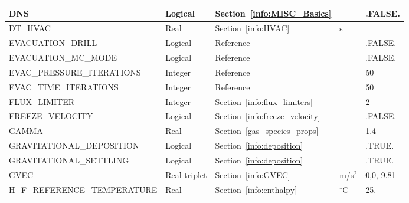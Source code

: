 \documentclass[11pt]{book}
\begin{document}
\begin{longtable}{@{\extracolsep{\fill}}|l|l|l|l|l|}
{\ct DNS}                                       & Logical       & Section~\ref{info:MISC_Basics}                        &               & {\ct .FALSE.}     \\ \hline
{\ct DT\_HVAC}                                  & Real          & Section~\ref{info:HVAC}                               & s             &                   \\ \hline
{\ct EVACUATION\_DRILL}                         & Logical       & Reference~\cite{FDS_Evac_Users_Guide}                 &               & {\ct .FALSE.}     \\ \hline
{\ct EVACUATION\_MC\_MODE}                      & Logical       & Reference~\cite{FDS_Evac_Users_Guide}                 &               & {\ct .FALSE.}     \\ \hline
{\ct EVAC\_PRESSURE\_ITERATIONS}                & Integer       & Reference~\cite{FDS_Evac_Users_Guide}                 &               & 50                \\ \hline
{\ct EVAC\_TIME\_ITERATIONS}                    & Integer       & Reference~\cite{FDS_Evac_Users_Guide}                 &               & 50                \\ \hline
{\ct FLUX\_LIMITER}                             & Integer       & Section~\ref{info:flux_limiters}                      &               & 2                 \\ \hline
{\ct FREEZE\_VELOCITY}                          & Logical       & Section~\ref{info:freeze_velocity}                    &               & {\ct .FALSE.}     \\ \hline
{\ct GAMMA}                                     & Real          & Section~\ref{gas_species_props}                       &               & 1.4               \\ \hline
{\ct GRAVITATIONAL\_DEPOSITION}                 & Logical       & Section~\ref{info:deposition}                         &               & {\ct .TRUE.}      \\ \hline
{\ct GRAVITATIONAL\_SETTLING}                   & Logical       & Section~\ref{info:deposition}                         &               & {\ct .TRUE.}      \\ \hline
{\ct GVEC}                                      & Real triplet  & Section~\ref{info:GVEC}                               & m/s$^2$       & 0,0,-9.81         \\ \hline
{\ct H\_F\_REFERENCE\_TEMPERATURE}              & Real          & Section~\ref{info:enthalpy}                           & $^\circ$C     & 25.             \\ \hline

\end{longtable}
\end{document}
